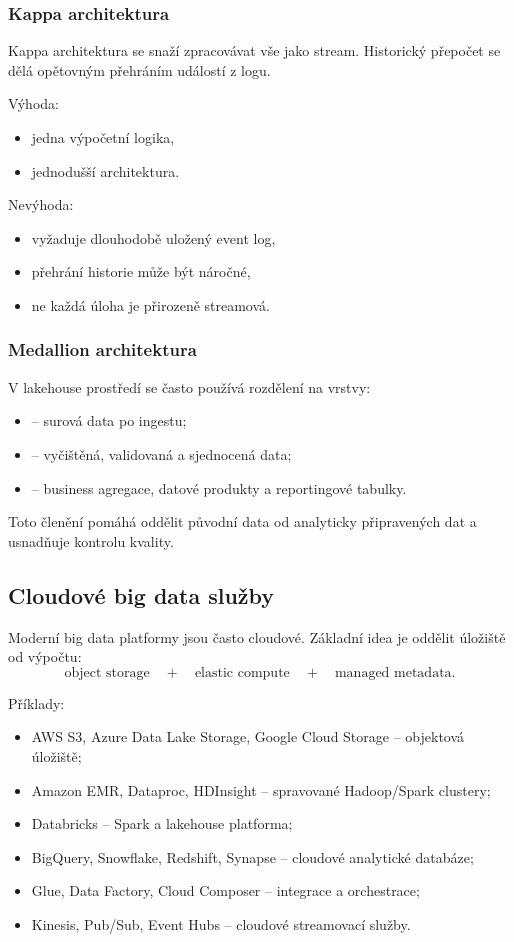 \subsubsection{Kappa architektura}

Kappa architektura se snaží zpracovávat vše jako stream. Historický přepočet se dělá opětovným přehráním
událostí z logu.

Výhoda:
\begin{itemize}
    \item jedna výpočetní logika,
    \item jednodušší architektura.
\end{itemize}

Nevýhoda:
\begin{itemize}
    \item vyžaduje dlouhodobě uložený event log,
    \item přehrání historie může být náročné,
    \item ne každá úloha je přirozeně streamová.
\end{itemize}

\subsubsection{Medallion architektura}

V lakehouse prostředí se často používá rozdělení na vrstvy:
\begin{itemize}
    \item {} -- surová data po ingestu;
    \item {} -- vyčištěná, validovaná a sjednocená data;
    \item {} -- business agregace, datové produkty a reportingové tabulky.
\end{itemize}

Toto členění pomáhá oddělit původní data od analyticky připravených dat a usnadňuje kontrolu kvality.

\subsection{Cloudové big data služby}

Moderní big data platformy jsou často cloudové. Základní idea je oddělit úložiště od výpočtu:
\[
\text{object storage}
\quad + \quad
\text{elastic compute}
\quad + \quad
\text{managed metadata}.
\]

Příklady:
\begin{itemize}
    \item AWS S3, Azure Data Lake Storage, Google Cloud Storage -- objektová úložiště;
    \item Amazon EMR, Dataproc, HDInsight -- spravované Hadoop/Spark clustery;
    \item Databricks -- Spark a lakehouse platforma;
    \item BigQuery, Snowflake, Redshift, Synapse -- cloudové analytické databáze;
    \item Glue, Data Factory, Cloud Composer -- integrace a orchestrace;
    \item Kinesis, Pub/Sub, Event Hubs -- cloudové streamovací služby.
\end{itemize}

